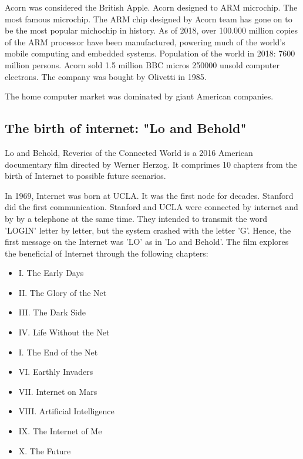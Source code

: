     
    
 Acorn was considered the British Apple.    
 Acorn designed to ARM microchip. The most famous microchip.
 The ARM chip designed by Acorn team has gone on to be the most popular michochip in history.  
 As of 2018, over 100.000 million copies of the ARM processor have been manufactured, powering much of the world's mobile computing and 
 embedded systems. Population of the world in 2018: 7600 million persons. 
 Acorn sold 1.5 million BBC micros 
 250000 unsold computer electrons.     
 The company was bought by Olivetti in 1985. 
      
    
 The home computer market was dominated by giant American companies. 
       
  
 
    
   
    
        \subsection*{The birth of internet: "Lo and Behold"} 
 Lo and Behold, Reveries of the Connected World is a 2016 American documentary film 
 directed by Werner Herzog. It comprimes 10 chapters from the birth of Internet to possible future 
 scenarios. 
 
 In 1969, Internet was born at UCLA.   
 It was the first node for decades. 
 Stanford did the first communication. 
 Stanford and UCLA were connected by internet and by by a telephone at the same time.  
 They intended to transmit the word 'LOGIN' letter by letter,  
 but the system crashed with the letter 'G'. 
 Hence, the first message on the Internet was 'LO' as in 'Lo and Behold'.    
 The film explores the beneficial of  Internet through the following chapters: 
 \begin{itemize} 
 \setlength\itemsep{0cm}
 \item I. The Early Days
 \item II.  The Glory of the Net
 \item III. The Dark Side
 \item IV. Life Without the Net
 \item I. The End of the Net
 \item VI.  Earthly Invaders
 \item VII.  Internet on Mars
 \item VIII.  Artificial Intelligence
 \item IX. The Internet of Me
 \item X. The Future
 \end{itemize} 
 
